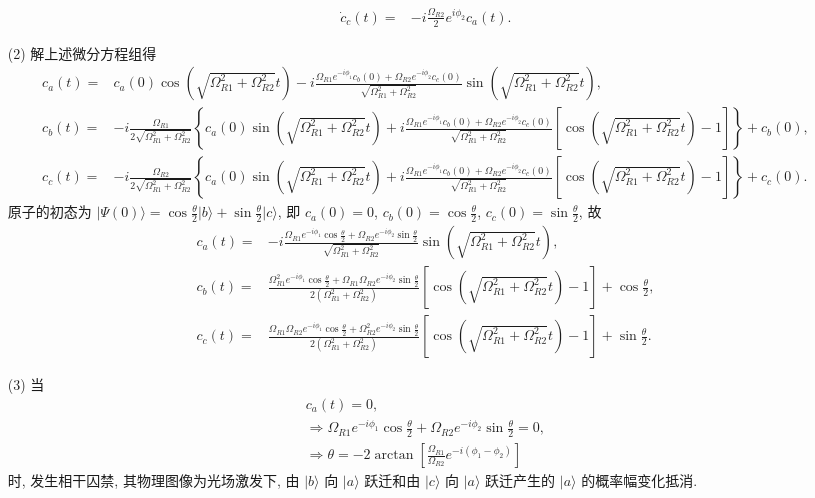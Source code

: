 \documentclass{assignment}
\begin{document}
\begin{sol}
\begin{itemize}
\begin{align}
            \dot{c}_c(t)=&-i\frac{\Omega_{R2}}{2}e^{i\phi_2}c_a(t).
        \end{align}
        \item[(2)] 解上述微分方程组得
        {\footnotesize
        \begin{align}
            c_a(t)=&c_a(0)\cos\left(\sqrt{\Omega_{R1}^2+\Omega_{R2}^2}t\right)-i\frac{\Omega_{R1}e^{-i\phi_1}c_b(0)+\Omega_{R2}e^{-i\phi_2}c_c(0)}{\sqrt{\Omega_{R1}^2+\Omega_{R2}^2}}\sin\left(\sqrt{\Omega_{R1}^2+\Omega_{R2}^2}t\right),\\
            c_b(t)=&-i\frac{\Omega_{R1}}{2\sqrt{\Omega_{R1}^2+\Omega_{R2}^2}}\left\{c_a(0)\sin\left(\sqrt{\Omega_{R1}^2+\Omega_{R2}^2}t\right)+i\frac{\Omega_{R1}e^{-i\phi_1}c_b(0)+\Omega_{R2}e^{-i\phi_2}c_c(0)}{\sqrt{\Omega_{R1}^2+\Omega_{R2}^2}}\left[\cos\left(\sqrt{\Omega_{R1}^2+\Omega_{R2}^2}t\right)-1\right]\right\}+c_b(0),\\
            c_c(t)=&-i\frac{\Omega_{R2}}{2\sqrt{\Omega_{R1}^2+\Omega_{R2}^2}}\left\{c_a(0)\sin\left(\sqrt{\Omega_{R1}^2+\Omega_{R2}^2}t\right)+i\frac{\Omega_{R1}e^{-i\phi_1}c_b(0)+\Omega_{R2}e^{-i\phi_2}c_c(0)}{\sqrt{\Omega_{R1}^2+\Omega_{R2}^2}}\left[\cos\left(\sqrt{\Omega_{R1}^2+\Omega_{R2}^2}t\right)-1\right]\right\}+c_c(0).
        \end{align}
        }
        原子的初态为 $\lvert\Psi(0)\rangle=\cos\frac{\theta}{2}\lvert b\rangle+\sin\frac{\theta}{2}\lvert c\rangle$, 即 $c_a(0)=0$, $c_b(0)=\cos\frac{\theta}{2}$, $c_c(0)=\sin\frac{\theta}{2}$, 故
        \begin{align}
            c_a(t)=&-i\frac{\Omega_{R1}e^{-i\phi_1}\cos\frac{\theta}{2}+\Omega_{R2}e^{-i\phi_2}\sin\frac{\theta}{2}}{\sqrt{\Omega_{R1}^2+\Omega_{R2}^2}}\sin\left(\sqrt{\Omega_{R1}^2+\Omega_{R2}^2}t\right),\\
            c_b(t)=&\frac{\Omega_{R1}^2e^{-i\phi_1}\cos\frac{\theta}{2}+\Omega_{R1}\Omega_{R2}e^{-i\phi_2}\sin\frac{\theta}{2}}{2(\Omega_{R1}^2+\Omega_{R2}^2)}\left[\cos\left(\sqrt{\Omega_{R1}^2+\Omega_{R2}^2}t\right)-1\right]+\cos\frac{\theta}{2},\\
            c_c(t)=&\frac{\Omega_{R1}\Omega_{R2}e^{-i\phi_1}\cos\frac{\theta}{2}+\Omega_{R2}^2e^{-i\phi_2}\sin\frac{\theta}{2}}{2(\Omega_{R1}^2+\Omega_{R2}^2)}\left[\cos\left(\sqrt{\Omega_{R1}^2+\Omega_{R2}^2}t\right)-1\right]+\sin\frac{\theta}{2}.
        \end{align}
        \item[(3)] 当
        \begin{gather}
            c_a(t)=0,\\
            \Longrightarrow\Omega_{R1}e^{-i\phi_1}\cos\frac{\theta}{2}+\Omega_{R2}e^{-i\phi_2}\sin\frac{\theta}{2}=0,\\
            \Longrightarrow\theta=-2\arctan\left[\frac{\Omega_{R1}}{\Omega_{R2}}e^{-i(\phi_1-\phi_2)}\right]
        \end{gather}
        时, 发生相干囚禁, 其物理图像为光场激发下, 由 $\lvert b\rangle$ 向 $\lvert a\rangle$ 跃迁和由 $\lvert c\rangle$ 向 $\lvert a\rangle$ 跃迁产生的 $\lvert a\rangle$ 的概率幅变化抵消.
    \end{itemize}
\end{sol}
\end{document}
